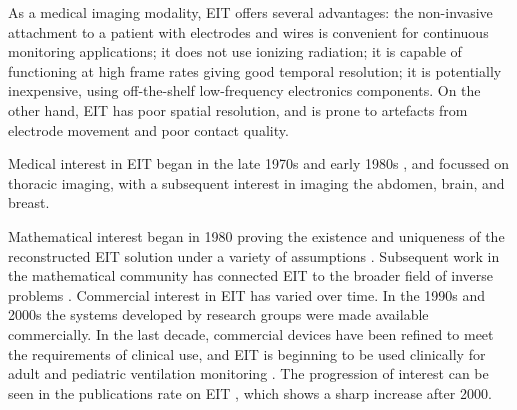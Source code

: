 \documentclass[12pt]{article} \usepackage[margin=3cm]{geometry} \usepackage[margin=20pt,font=small,labelfont=bf]{caption}\def\TBLWIDA{35mm}\def\TBLWIDB{95mm}
\begin{document}
As a medical imaging modality, EIT offers several advantages:
the non-invasive attachment to a patient with electrodes and wires
is convenient for continuous monitoring applications;
it does not use ionizing radiation;
it is capable of functioning at high frame rates giving
good temporal resolution; 
it is potentially inexpensive, using off-the-shelf low-frequency electronics components. 
On the other hand, EIT has poor spatial resolution, and 
is prone to artefacts from electrode
movement and poor contact quality.



\begin{comment}
Medical applications of EIT have been a subject to active
research for nearly 40 years.
The last decade has seen a strong growth in 
clincal research and 
commercial interest, the availability of medically
certified devices, and early results from clinical use.

In the medical community, early work began in 
the late 1970s in USA \cite{Henderson78}, and
in the early 1980s in UK \cite{Barber1983}.
\end{comment}

Medical interest in EIT began in the late 1970s \cite{Henderson1978}
and early 1980s \cite{Barber1983}, and 
focussed on thoracic imaging,
with a subsequent interest in imaging the
abdomen, brain, and breast.
\begin{comment}
 From the late
1980s to the mid 1990s, much innovation in 
EIT was channelled through
a European Concerted Action on Impedance Tomography (CAIT),
as its associated European Community workshops on EIT.
After the end of the CAIT funding, the EIT technology community met through a
series of yearly International conferences on the biomedical applications of EIT.
\end{comment}
Mathematical interest began
in 1980 \cite{Calderon1980} proving
the existence and uniqueness of the reconstructed EIT solution 
under a variety of assumptions \cite{Sylvester1986Uniqueness}.
Subsequent work in the mathematical community has
connected EIT to the broader field
of inverse problems \cite{Uhlmann2009EIT}.
Commercial interest in EIT has varied over time. In the 1990s
and 2000s the systems developed by research groups were made
available commercially. In the last decade, 
commercial devices have been 
refined to meet the requirements of clinical use, and EIT
is beginning to be used clinically for adult and pediatric
ventilation monitoring \cite{Frerichs2017Chest}.
The progression of interest can be seen in 
the publications rate on EIT \cite{Adler2012Whither}, which
shows a sharp increase after 2000.
\end{document}
